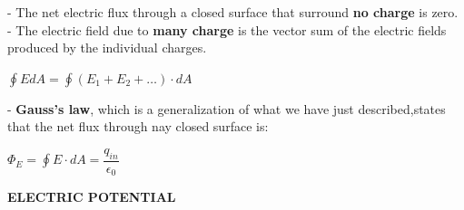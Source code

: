 \documentclass[10pt]{article}
\begin{document}
\begin{enumerate}
     - The net electric flux through a closed surface that surround \textbf{no charge} is zero.\\
     - The electric field due to \textbf{many charge} is the vector sum of the electric fields produced by the individual charges.
     \begin{mybox}
     \begin{center}
     $\displaystyle \oint \textbf{$E$} d \textbf{$A$} = \oint (\textbf{$E_1$} + \textbf{$E_2$} + \ldots) \cdot d \textbf{$A$}$
     \end{center}
     \end{mybox}
     - \textbf{Gauss's law}, which is a generalization of what we have just described,states that the net flux through nay closed surface is:
     \begin{mybox}
     \begin{center}
     $\Phi_E = \oint \textbf{$E$} \cdot d\textbf{$A$} = \dfrac{\textbf{$q_{in}$}}{\textbf{$\epsilon_0$}}$
     \end{center}
     \end{mybox}
\end{enumerate}
\pagebreak
\begin{center}
\textbf{ELECTRIC POTENTIAL}
\end{center}
\end{document}
